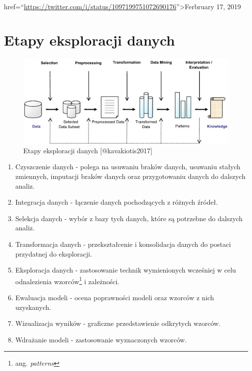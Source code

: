 \documentclass[
]{book}
\providecommand{\tightlist}{%
  \setlength{\itemsep}{0pt}\setlength{\parskip}{0pt}}
\theoremstyle{plain}
\theoremstyle{definition}
\theoremstyle{definition}
\theoremstyle{definition}
\theoremstyle{definition}
\theoremstyle{definition}
\theoremstyle{remark}
\begin{document}
href=``\url{https://twitter.com/i/status/1097199751072690176}''\textgreater Ferbruary 17, 2019

\section*{Etapy eksploracji danych}\label{etapy-eksploracji-danych}

\begin{figure}
\includegraphics[width=7.56in]{images/dm_stages} \caption{Etapy eksploracji danych [@kavakiotis2017]}\label{fig:unnamed-chunk-2}
\end{figure}

\begin{enumerate}
\def\labelenumi{\arabic{enumi}.}
\tightlist
\item
  Czyszczenie danych - polega na usuwaniu braków danych, usuwaniu stałych zmiennych, imputacji braków danych oraz przygotowaniu danych do dalszych analiz.
\item
  Integracja danych - łączenie danych pochodzących z różnych źródeł.
\item
  Selekcja danych - wybór z bazy tych danych, które są potrzebne do dalszych analiz.
\item
  Transformacja danych - przekształcenie i konsolidacja danych do postaci przydatnej do eksploracji.
\item
  Eksploracja danych - zastosowanie technik wymienionych wcześniej w celu odnalezienia wzorców\footnote{ang. \emph{patterns}} i zależności.
\item
  Ewaluacja modeli - ocena poprawności modeli oraz wzorców z nich uzyskanych.
\item
  Wizualizacja wyników - graficzne przedstawienie odkrytych wzorców.
\item
  Wdrażanie modeli - zastosowanie wyznaczonych wzorców.
\end{enumerate}
\end{document}
